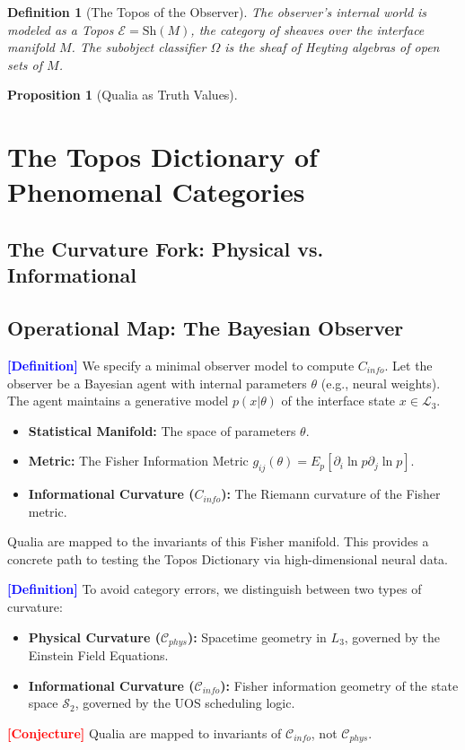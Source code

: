 \documentclass[11pt,titlepage]{article}
\newcommand{\interface}{\mathcal{L}_3}
\newcommand{\curvature}{\mathcal{C}}
\newcommand{\topos}{\mathcal{E}}
\newcommand{\classifier}{\Omega}
\newcommand{\tagdef}{\textcolor{blue}{\textbf{[Definition]}} }
\newcommand{\tagconj}{\textcolor{red}{\textbf{[Conjecture]}} }
\newtheorem{proposition}{Proposition}[section]
\newtheorem{definition}{Definition}[section]
\begin{document}
\begin{definition}[The Topos of the Observer]
The observer's internal world is modeled as a Topos $\topos = \text{Sh}(M)$, the category of sheaves over the interface manifold $M$. The subobject classifier $\classifier$ is the sheaf of Heyting algebras of open sets of $M$.
\end{definition}

\begin{proposition}[Qualia as Truth Values]

\end{proposition}


\section{The Topos Dictionary of Phenomenal Categories}

\subsection{The Curvature Fork: Physical vs. Informational}

\subsection{Operational Map: The Bayesian Observer}
\tagdef We specify a minimal observer model to compute $C_{info}$. Let the observer be a Bayesian agent with internal parameters $\theta$ (e.g., neural weights). The agent maintains a generative model $p(x | \theta)$ of the interface state $x \in \interface$.
\begin{itemize}
    
\item \textbf{Statistical Manifold:} The space of parameters $\theta$.
    
\item \textbf{Metric:} The Fisher Information Metric $g_{ij}(\theta) = E_p [\partial_i \ln p \partial_j \ln p]$.
    
\item \textbf{Informational Curvature ($C_{info}$):} The Riemann curvature of the Fisher metric.
\end{itemize}
Qualia are mapped to the invariants of this Fisher manifold. This provides a concrete path to testing the Topos Dictionary via high-dimensional neural data.

\tagdef To avoid category errors, we distinguish between two types of curvature:
\begin{itemize}
    
\item \textbf{Physical Curvature ($\curvature_{phys}$):} Spacetime geometry in $L_3$, governed by the Einstein Field Equations.
    
\item \textbf{Informational Curvature ($\curvature_{info}$):} Fisher information geometry of the state space $\mathcal{S}_2$, governed by the UOS scheduling logic.
\end{itemize}
\tagconj Qualia are mapped to invariants of $\curvature_{info}$, not $\curvature_{phys}$.
\end{document}
